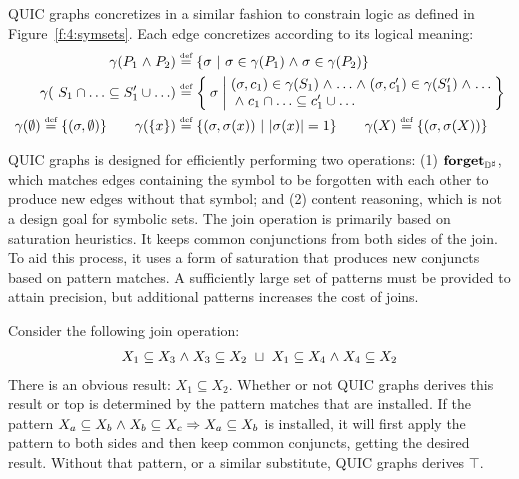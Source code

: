 QUIC graphs concretizes in a similar fashion to constrain logic as defined in Figure~\ref{f:4:symsets}.  Each edge concretizes according to its logical meaning:
\begin{align*}
  \gamma(P_1 \logand P_2) &\defeq \{ \state \ | \ \state \in \gamma(P_1) \logand \state \in \gamma(P_2) \} \\
  \gamma(\ S_1 \cap \ldots \subseteq S'_1 \cup \ldots) &\defeq \Set{ \state | \begin{array}{@{}l@{}}
       (\state,c_1) \in \gamma(S_1) \logand \ldots \logand (\state,c'_1) \in \gamma(S'_1) \logand \ldots \\
       {} \logand c_1 \cap \ldots \subseteq c'_1 \cup \ldots
    \end{array}
  } \\
  \gamma(\emptyset) \defeq \{ (\state, \emptyset) \}
  \qquad \gamma(\{x\}) &\defeq \{ (\state, \state(x)) \ | \ |\state(x)| = 1 \} \qquad \gamma(X) \defeq \{ (\state, \state(X)) \}
\end{align*}

QUIC graphs is designed for efficiently performing two operations: (1) $\textbf{forget}_{{\mathbb{D}}^{\sharp}}$, which matches edges containing the symbol to be forgotten with each other to produce new edges without that symbol; and (2) content reasoning, which is not a design goal for symbolic sets.  The join operation is primarily based on saturation heuristics.  It keeps common conjunctions from both sides of the join.  To aid this process, it uses a form of saturation that produces new conjuncts based on pattern matches.  A sufficiently large set of patterns must be provided to attain precision, but additional patterns increases the cost of joins.
\begin{example}  Consider the following join operation:
    \begin{align*}
      X_1 \subseteq X_3 \mathrel{\wedge} X_3 \subseteq X_2 \ \sqcup \ X_1 \subseteq X_4 \mathrel{\wedge} X_4 \subseteq X_2
    \end{align*}
    There is an obvious result: $X_1 \subseteq X_2$.  Whether or not QUIC graphs derives this result or top is determined by the pattern matches that are installed.  If the pattern $X_a \subseteq X_b \mathrel{\wedge} X_b \subseteq X_c \Rightarrow X_a \subseteq X_b$ is installed, it will first apply the pattern to both sides and then keep common conjuncts, getting the desired result.  Without that pattern, or a similar substitute, QUIC graphs derives $\top$.
\end{example}

